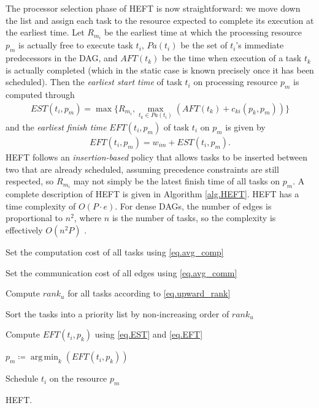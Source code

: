 \documentclass[runningheads]{llncs}
\DeclareMathOperator*{\argmin}{arg\,min}
\begin{document}
The processor selection phase of HEFT is now straightforward: we move down the list and assign each task to the resource expected to complete its execution at the earliest time. Let $R_{m_i}$ be the earliest time at which the processing resource $p_m$ is actually free to execute task $t_i$, $Pa(t_i)$ be the set of $t_i$'s immediate predecessors in the DAG, and $AFT(t_k)$ be the time when execution of a task $t_k$ is actually completed (which in the static case is known precisely once it has been scheduled). Then the {\em earliest start time} of task $t_i$ on processing resource $p_m$ is computed through
\begin{align}
\label{eq.EST}
EST(t_i, p_m) = \max \bigg\{ R_{m_i}, \max_{t_k \in Pa(t_i)} (AFT(t_k) + c_{ki}(p_k, p_m)) \bigg\}
\end{align}
and the {\em earliest finish time} $EFT(t_i, p_m)$ of task $t_i$ on $p_m$ is given by 
\begin{align}
\label{eq.EFT}
EFT(t_i, p_m) = w_{im} + EST(t_i, p_m).
\end{align}
HEFT follows an {\em insertion-based} policy that allows tasks to be inserted between two that are already scheduled, assuming precedence constraints are still respected, so $R_{m_i}$ may not simply be the latest finish time of all tasks on $p_m$. A complete description of HEFT is given in Algorithm \ref{alg.HEFT}. HEFT has a time complexity of $O(P \cdot e)$. For dense DAGs, the number of edges is proportional to $n^2$, where $n$ is the number of tasks, so the complexity is effectively $O(n^2P)$ \cite{topcuoglu2002performance}. 
\begin{algorithm}	
	
	Set the computation cost of all tasks using \eqref{eq.avg_comp}
	
	Set the communication cost of all edges using \eqref{eq.avg_comm}
	
	Compute $rank_u$ for all tasks according to \eqref{eq.upward_rank}
	
	Sort the tasks into a priority list by non-increasing order of $rank_u$
	
	{	
		
		{Compute $EFT(t_i, p_k)$ using \eqref{eq.EST} and \eqref{eq.EFT}}
		
		$p_m \coloneqq \argmin_k(EFT(t_i, p_k))$
		
		Schedule $t_i$ on the resource $p_m$ 
		
	}	
	\caption{HEFT.}
	\label{alg.HEFT}
\end{algorithm} 
\end{document}
